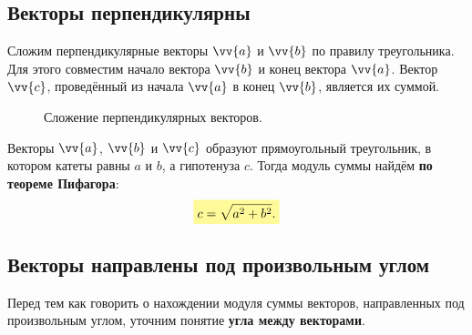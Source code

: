 \subsection{Векторы перпендикулярны}
Сложим перпендикулярные векторы $\vv{a}$ и $\vv{b}$ по правилу треугольника.
Для этого совместим начало вектора $\vv{b}$ и конец вектора $\vv{a}$. Вектор $\vv{c}$,
проведённый из начала $\vv{a}$ в конец $\vv{b}$, является их суммой.

\begin{figure}[h!]
  \centering
  \hspace{1.7cm}
  \caption{\small Сложение перпендикулярных векторов.}\label{pic:sum3}
\end{figure}

Векторы $\vv{a}$, $\vv{b}$ и $\vv{c}$ образуют прямоугольный треугольник,
в котором катеты равны $a$ и $b$, а гипотенуза \bdash $c$.
Тогда модуль суммы найдём \textbf{по теореме Пифагора}:
{\large
  \begin{align}
    \hly{c = \sqrt{a^2 + b^2}.}
  \end{align}
}
\subsection{Векторы направлены под произвольным углом}
Перед тем как говорить о нахождении модуля суммы векторов,
направленных под произвольным углом, уточним понятие
\textbf{угла между векторами}. 

